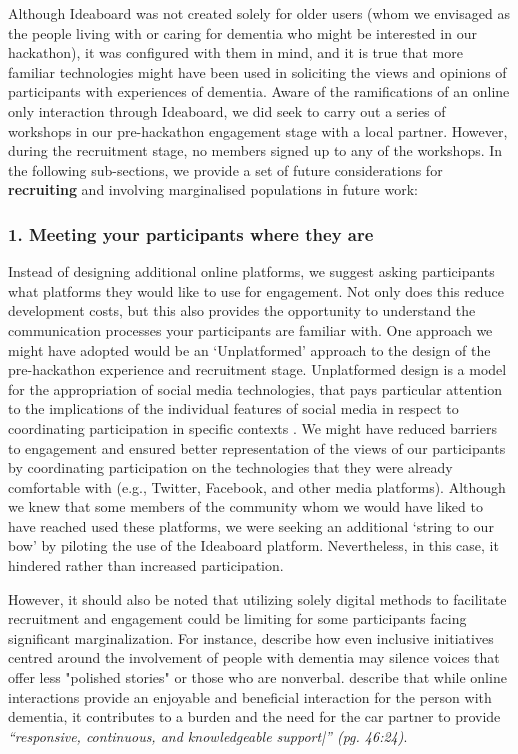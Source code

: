 Although Ideaboard was not created solely for older users (whom we envisaged as the people living with or caring for dementia who might be interested in our hackathon), it was configured with them in mind, and it is true that more familiar technologies might have been used in soliciting the views and opinions of participants with experiences of dementia.  Aware of the ramifications of an online only interaction through Ideaboard, we did seek to carry out a series of workshops in our pre-hackathon engagement stage with a local partner. However, during the recruitment stage, no members signed up to any of the workshops. In the following sub-sections, we provide a set of future considerations for \textbf{recruiting} and involving marginalised populations in future work:


\subsubsection{1. Meeting your participants where they are}
\label{participantsWhereTheyAre}
Instead of designing additional online platforms, we suggest asking participants what platforms they would like to use for engagement. Not only does this reduce development costs, but this also provides the opportunity to understand the communication processes your participants are familiar with. One approach we might have adopted would be an ‘Unplatformed’ approach to the design of the pre-hackathon experience and recruitment stage. Unplatformed design is a model for the appropriation of social media technologies, that pays particular attention to the implications of the individual features of social media in respect to coordinating participation in specific contexts \citep{lambton-howard_unplatformed_2020}. We might have reduced barriers to engagement and ensured better representation of the views of our participants by coordinating participation on the technologies that they were already comfortable with (e.g., Twitter, Facebook, and other media platforms). Although we knew that some members of the community whom we would have liked to have reached used these platforms, we were seeking an additional ‘string to our bow’ by piloting the use of the Ideaboard platform. Nevertheless, in this case, it hindered rather than increased participation. 

However, it should also be noted that utilizing solely digital methods to facilitate recruitment and engagement could be limiting for some participants facing significant marginalization. For instance, \citep{lazar_safe_2019} describe how even inclusive initiatives centred around the involvement of people with dementia may silence voices that offer less "polished stories" or those who are nonverbal. \cite{dai2020making} describe that while online interactions provide an enjoyable and beneficial interaction for the person with dementia, it contributes to a burden and the need for the car partner to provide \textit{“responsive, continuous, and knowledgeable support|” (pg. 46:24)\citep{hwang2020exploring}}. 

